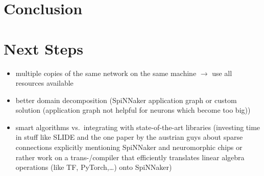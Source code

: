 \documentclass[]{article}
\begin{document}
\section{Conclusion}
\label{sec:conclusion}

\section{Next Steps}
\label{sec:next_steps}

\begin{itemize}
  \item multiple copies of the same network on the same machine
    $\rightarrow$ use all resources available
  \item better domain decomposition (SpiNNaker application graph or
    custom solution (application graph not helpful for neurons which
    become too big))
  \item smart algorithms vs.\ integrating with state-of-the-art libraries
    (investing time in stuff like SLIDE and the one paper by the austrian
    guys about sparse connections explicitly mentioning SpiNNaker and
    neuromorphic chips or rather work on a trans-/compiler
    that efficiently translates linear algebra operations (like TF,
    PyTorch,\dots) onto SpiNNaker)
\end{itemize}


\end{document}
